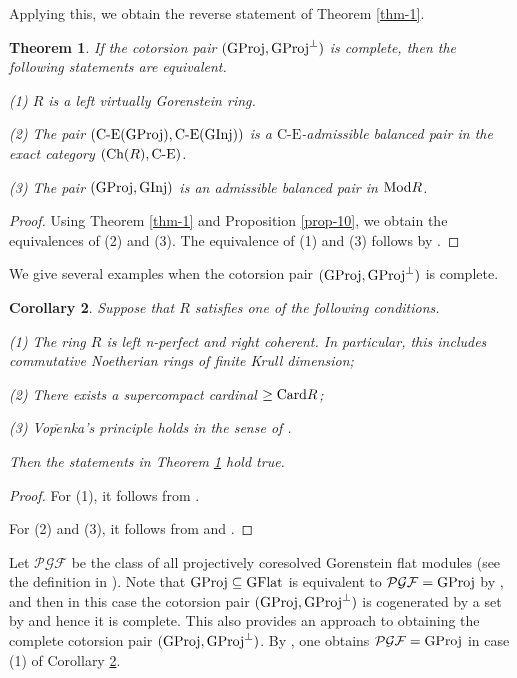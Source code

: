 \documentclass[reqno,12pt]{amsart}
\numberwithin{equation}{section}
\def\Ch{\mbox{\rm Ch}}
\theoremstyle{plain}
\newtheorem{theorem}{\bf Theorem}[section]
\newtheorem{corollary}[theorem]{\bf Corollary}
\theoremstyle{definition}
\newcommand{\CE}{\mathrm{C}\text{-}\mathrm{E}}
\begin{document}
Applying this, we obtain the reverse statement of Theorem \ref{thm-1}.

\begin{theorem}\label{thm-2}
    If the cotorsion pair $({\rm GProj},{\rm GProj}^{\bot})$ is complete, then the following statements are equivalent.

    {\rm (1)} $R$ is a left virtually Gorenstein ring.

    {\rm (2)} The pair $(\CE({\rm GProj}),\CE({\rm GInj}))$ is a $\CE$-admissible balanced pair in the exact category $(\Ch(R),\CE)$.

    {\rm (3)} The pair $({\rm GProj},{\rm GInj})$ is an admissible balanced pair in $\mbox{\rm Mod} R$.
\end{theorem}
\begin{proof}
    Using Theorem \ref{thm-1} and Proposition \ref{prop-10}, we obtain the equivalences of {\rm (2)} and {\rm (3)}. The equivalence of {\rm (1)} and {\rm (3)} follows by \cite[Corollary 4.8]{EPZ20}.
\end{proof}

We give several examples when the cotorsion pair $({\rm GProj},{\rm GProj}^{\bot})$ is
complete.

\begin{corollary}\label{coro-4}
    Suppose that $R$ satisfies one of the following conditions.

    {\rm (1)} The ring $R$ is left n-perfect and right coherent. In particular, this includes
    commutative Noetherian rings of finite Krull dimension;

    {\rm (2)} There exists a supercompact cardinal $\geq {\rm Card}R$;

    {\rm (3)} Vop$\check{e}$nka's principle holds in the sense of \cite{C25}.

    Then the statements in Theorem \ref{thm-2} hold true.
\end{corollary}
\begin{proof}
    For {\rm (1)}, it follows from \cite[Proposition 6]{EIO17}.

    For {\rm (2)} and {\rm (3)}, it follows from \cite[Theorem 5.2 and Proposition 5.6]{CS25} and \cite[Theorem 1.4(B)]{C25}.
\end{proof}

Let $\mathcal{PGF}$ be the class of all projectively coresolved Gorenstein flat modules (see the definition in \cite[Section 4]{SS20}). Note that ${\rm GProj}\subseteq{\rm GFlat}$ is equivalent to $\mathcal{PGF}={\rm GProj}$ by \cite[Theorem 3]{I20}, and then in this case the cotorsion pair $({\rm GProj},{\rm GProj}^{\bot})$ is cogenerated by a set by \cite[Theorem 4.9]{SS20} and hence it is complete. This also provides an approach to obtaining the complete cotorsion pair $({\rm GProj},{\rm GProj}^{\bot})$. By \cite[Theorem 4]{I20}, one obtains $\mathcal{PGF} = {\rm GProj}$ in case (1) of Corollary \ref{coro-4}.
\end{document}
